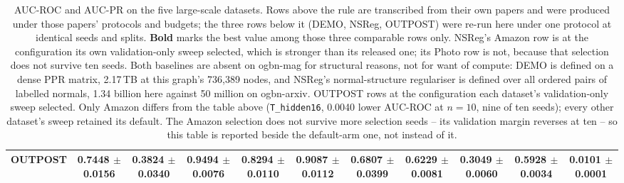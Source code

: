 \begin{table}[t]
\begin{tabular}{lcccccccccc}
\midrule
\textbf{OUTPOST} & \textbf{0.7448 $\pm$ 0.0156} & \textbf{0.3824 $\pm$ 0.0340} & 0.9494 $\pm$ 0.0076 & 0.8294 $\pm$ 0.0110 & 0.9087 $\pm$ 0.0112 & 0.6807 $\pm$ 0.0399 & 0.6229 $\pm$ 0.0081 & 0.3049 $\pm$ 0.0060 & \textbf{0.5928 $\pm$ 0.0034} & \textbf{0.0101 $\pm$ 0.0001} \\
\bottomrule
\end{tabular}
\caption{AUC-ROC and AUC-PR on the five large-scale datasets. Rows above the rule are transcribed from their own papers and were produced under those papers' protocols and budgets; the three rows below it (DEMO, NSReg, OUTPOST) were re-run here under one protocol at identical seeds and splits. \textbf{Bold} marks the best value among those three comparable rows only. NSReg's Amazon row is at the configuration its own validation-only sweep selected, which is stronger than its released one; its Photo row is not, because that selection does not survive ten seeds. Both baselines are absent on ogbn-mag for structural reasons, not for want of compute: DEMO is defined on a dense PPR matrix, 2.17\,TB at this graph's 736{,}389 nodes, and NSReg's normal-structure regulariser is defined over all ordered pairs of labelled normals, 1.34 billion here against 50 million on ogbn-arxiv. OUTPOST rows at the configuration each dataset's validation-only sweep selected. Only Amazon differs from the table above (\texttt{T\_hidden16}, 0.0040 lower AUC-ROC at $n{=}10$, nine of ten seeds); every other dataset's sweep retained its default. The Amazon selection does not survive more selection seeds -- its validation margin reverses at ten -- so this table is reported beside the default-arm one, not instead of it.}
\label{tab:table2_large_selarm}
\end{table}